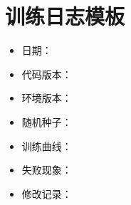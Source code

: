 \section{训练日志模板}

\begin{itemize}
  \item 日期：
  \item 代码版本：
  \item 环境版本：
  \item 随机种子：
  \item 训练曲线：
  \item 失败现象：
  \item 修改记录：
\end{itemize}
